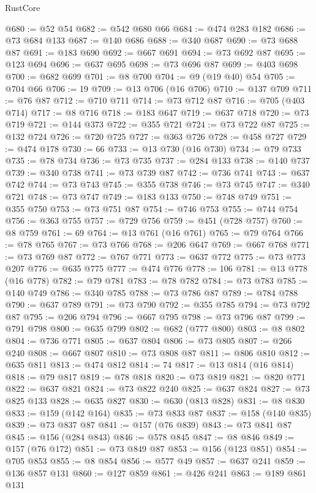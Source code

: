 \begin{lexlean}{RustCore}
\begin{coremodule}
@680 := @52 @54
@682 := @542 @680 @66
@684 := @474 @283 @182
@686 := @73 @684 @133
@687 := @140 @686
@688 := @340 @687
@690 := @73 @688 @87
@691 := @183 @690
@692 := @667 @691
@694 := @73 @692 @87
@695 := @123 @694
@696 := @637 @695
@698 := @73 @696 @87
@699 := @403 @698
@700 := @682 @699
@701 := @8 @700
@704 := @9 (@19 @40) @54
@705 := @704 @66
@706 := 19
@709 := @13 @706 (@16 @706)
@710 := @137 @709
@711 := @76 @87
@712 := @710 @711
@714 := @73 @712 @87
@716 := @705 (@403 @714)
@717 := @8 @716
@718 := @183 @647
@719 := @637 @718
@720 := @73 @719
@721 := @144 @373
@722 := @355 @721
@724 := @73 @722 @87
@725 := @132 @724
@726 := @720 @725
@727 := @363 @726
@728 := @458 @727
@729 := @474 @178
@730 := 66
@733 := @13 @730 (@16 @730)
@734 := @79 @733
@735 := @78 @734
@736 := @73 @735
@737 := @284 @133
@738 := @140 @737
@739 := @340 @738
@741 := @73 @739 @87
@742 := @736 @741
@743 := @637 @742
@744 := @73 @743
@745 := @355 @738
@746 := @73 @745
@747 := @340 @721
@748 := @73 @747
@749 := @183 @133
@750 := @748 @749
@751 := @355 @750
@753 := @73 @751 @87
@754 := @746 @753
@755 := @744 @754
@756 := @363 @755
@757 := @729 @756
@759 := @451 (@728 @757)
@760 := @8 @759
@761 := 69
@764 := @13 @761 (@16 @761)
@765 := @79 @764
@766 := @78 @765
@767 := @73 @766
@768 := @206 @647
@769 := @667 @768
@771 := @73 @769 @87
@772 := @767 @771
@773 := @637 @772
@775 := @73 @773 @207
@776 := @635 @775
@777 := @474 @776
@778 := 106
@781 := @13 @778 (@16 @778)
@782 := @79 @781
@783 := @78 @782
@784 := @73 @783
@785 := @140 @749
@786 := @340 @785
@788 := @73 @786 @87
@789 := @784 @788
@790 := @637 @789
@791 := @73 @790
@792 := @355 @785
@794 := @73 @792 @87
@795 := @206 @794
@796 := @667 @795
@798 := @73 @796 @87
@799 := @791 @798
@800 := @635 @799
@802 := @682 (@777 @800)
@803 := @8 @802
@804 := @736 @771
@805 := @637 @804
@806 := @73 @805
@807 := @266 @240
@808 := @667 @807
@810 := @73 @808 @87
@811 := @806 @810
@812 := @635 @811
@813 := @474 @812
@814 := 74
@817 := @13 @814 (@16 @814)
@818 := @79 @817
@819 := @78 @818
@820 := @73 @819
@821 := @820 @771
@822 := @637 @821
@824 := @73 @822 @240
@825 := @637 @824
@827 := @73 @825 @133
@828 := @635 @827
@830 := @630 (@813 @828)
@831 := @8 @830
@833 := @159 (@142 @164)
@835 := @73 @833 @87
@837 := @158 (@140 @835)
@839 := @73 @837 @87
@841 := @157 (@76 @839)
@843 := @73 @841 @87
@845 := @156 (@284 @843)
@846 := @578 @845
@847 := @8 @846
@849 := @157 (@76 @172)
@851 := @73 @849 @87
@853 := @156 (@123 @851)
@854 := @705 @853
@855 := @8 @854
@856 := @577 @49
@857 := @637 @241
@859 := @136 @857 @131
@860 := @127 @859
@861 := @426 @241
@863 := @189 @861 @131

\end{coremodule}
\end{lexlean}
